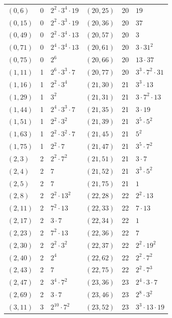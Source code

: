\documentclass[11pt]{article}
\begin{document}
\begin{longtable}{@{}lrl@{\qquad}lrl@{}}
$(0,6)$ & 0 & $2^{2}\cdot 3^{4}\cdot 19$ & $(20,25)$ & 20 & $19$\\
$(0,15)$ & 0 & $2^{2}\cdot 3^{3}\cdot 19$ & $(20,36)$ & 20 & $37$\\
$(0,49)$ & 0 & $2^{2}\cdot 3^{4}\cdot 13$ & $(20,57)$ & 20 & $3$\\
$(0,71)$ & 0 & $2^{4}\cdot 3^{4}\cdot 13$ & $(20,61)$ & 20 & $3\cdot 31^{2}$\\
$(0,75)$ & 0 & $2^{6}$ & $(20,66)$ & 20 & $13\cdot 37$\\
$(1,11)$ & 1 & $2^{6}\cdot 3^{3}\cdot 7$ & $(20,77)$ & 20 & $3^{3}\cdot 7^{2}\cdot 31$\\
$(1,16)$ & 1 & $2^{2}\cdot 3^{4}$ & $(21,30)$ & 21 & $3^{3}\cdot 13$\\
$(1,29)$ & 1 & $3^{2}$ & $(21,31)$ & 21 & $3\cdot 7^{2}\cdot 13$\\
$(1,44)$ & 1 & $2^{4}\cdot 3^{3}\cdot 7$ & $(21,35)$ & 21 & $3\cdot 19$\\
$(1,51)$ & 1 & $2^{2}\cdot 3^{2}$ & $(21,39)$ & 21 & $3^{5}\cdot 5^{2}$\\
$(1,63)$ & 1 & $2^{2}\cdot 3^{2}\cdot 7$ & $(21,45)$ & 21 & $5^{2}$\\
$(1,75)$ & 1 & $2^{2}\cdot 7$ & $(21,47)$ & 21 & $3^{5}\cdot 7^{2}$\\
$(2,3)$ & 2 & $2^{2}\cdot 7^{2}$ & $(21,51)$ & 21 & $3\cdot 7$\\
$(2,4)$ & 2 & $7$ & $(21,52)$ & 21 & $3^{3}\cdot 5^{2}$\\
$(2,5)$ & 2 & $7$ & $(21,75)$ & 21 & $1$\\
$(2,8)$ & 2 & $2^{2}\cdot 13^{2}$ & $(22,28)$ & 22 & $2^{2}\cdot 13$\\
$(2,11)$ & 2 & $7^{2}\cdot 13$ & $(22,33)$ & 22 & $7\cdot 13$\\
$(2,17)$ & 2 & $3\cdot 7$ & $(22,34)$ & 22 & $1$\\
$(2,23)$ & 2 & $7^{2}\cdot 13$ & $(22,36)$ & 22 & $7$\\
$(2,30)$ & 2 & $2^{2}\cdot 3^{2}$ & $(22,37)$ & 22 & $2^{2}\cdot 19^{2}$\\
$(2,40)$ & 2 & $2^{4}$ & $(22,62)$ & 22 & $2^{2}\cdot 7^{2}$\\
$(2,43)$ & 2 & $7$ & $(22,75)$ & 22 & $2^{2}\cdot 7^{3}$\\
$(2,47)$ & 2 & $3^{4}\cdot 7^{2}$ & $(23,36)$ & 23 & $2^{4}\cdot 3\cdot 7$\\
$(2,69)$ & 2 & $3\cdot 7$ & $(23,46)$ & 23 & $2^{8}\cdot 3^{2}$\\
$(3,11)$ & 3 & $2^{10}\cdot 7^{2}$ & $(23,52)$ & 23 & $3^{3}\cdot 13\cdot 19$\\

\end{longtable}
\end{document}
